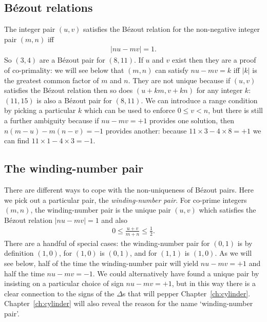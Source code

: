 \subsection{B\'ezout relations}
The integer pair $(u,v)$ satisfies the B\'ezout relation for the non-negative integer pair $(m,n)$ iff
\begin{align}
	|n  u-mv| = 1.
\end{align}
So $(3,4)$ are a B\'ezout pair for $(8,11)$. 
If $u$ and $v$ exist then they are a proof of co-primality: we will see below that $(m,n)$ can satisfy  $ n  u - m v= k$ iff $|k|$ is the greatest common factor of $m$ and $n$. They are not unique because if $(u,v)$ satisfies the B\'ezout relation then so does $(u+km,v+kn)$ for any integer $k$: $(11,15)$ is also a B\'ezout pair for $(8,11)$. We can introduce a range condition by picking a particular $k$ which can be used to enforce $0\leq v< n$, but there is still a further ambiguity because if
$n u- m v  =+1$ provides one solution, then $n(m-u)-m(n-v)=-1$ provides another: because $11\times3-4\times8 =+1$ we can find $11\times 1-4\times 3=-1$. 

\subsection{The winding-number pair}
\label{sec:wnp}
There are different ways to cope with the non-uniqueness of  B\'ezout pairs.
Here we pick out a particular pair, the \textit{winding-number pair}. 
For co-prime integers  $(m,n)$, the winding-number pair is the unique pair  $(u,v)$ which satisfies the B\'ezout relation $|n  u-mv| = 1$ and also
\begin{align}
	0\leq \frac{u+v}{m+n}\leq \frac{1}{2}. \label{eq:wnpFarey}
\end{align}
There are a handful of special cases: the winding-number pair for  $(0,1)$ is by definition $(1,0)$, for $(1,0)$ is $(0,1)$, and for $(1,1)$ is $(1,0)$. 
As we will see below, half of the time the winding-number pair will yield $nu-mv=+1$ and half the time $n u-m v=-1$. We could alternatively have found a unique pair by insisting on a particular choice of sign $nu-mv=+1$, but in this way there is a clear connection to the signs of the $\Delta$s that will pepper Chapter~\ref{ch:cylinder}. Chapter~\ref{ch:cylinder} will also reveal the reason for the name `winding-number pair'. 


